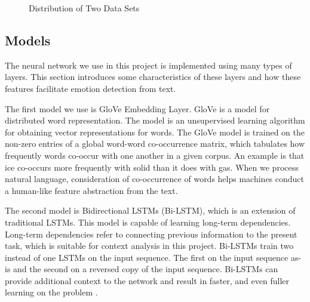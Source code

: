 \documentclass[11pt,a4paper,man,floatsintext]{apa6}
\begin{document}
\begin{figure}[H]
\hfill
{}
\hfill
{}
\hfill
\caption{Distribution of Two Data Sets\label{datadist}}
\end{figure}

\subsection{Models}
The neural network we use in this project is implemented using many types of layers. This section introduces some characteristics of these layers and how these features facilitate emotion detection from text.

The first model we use is GloVe Embedding Layer. GloVe \cite{GloVe} is a model for distributed word representation. The model is an unsupervised learning algorithm for obtaining vector representations for words. The GloVe model is trained on the non-zero entries of a global word-word co-occurrence matrix, which tabulates how frequently words co-occur with one another in a given corpus. An example is that ice co-occurs more frequently with solid than it does with gas. When we process natural language, consideration of co-occurrence of words helps machines conduct a human-like feature abstraction from the text.

The second model is Bidirectional LSTMs (Bi-LSTM), which is an extension of traditional LSTMs. This model is capable of learning long-term dependencies. Long-term dependencies refer to connecting previous information to the present task, which is suitable for context analysis in this project. Bi-LSTMs train two instead of one LSTMs on the input sequence. The first on the input sequence as-is and the second on a reversed copy of the input sequence. Bi-LSTMs can provide additional context to the network and result in faster, and even fuller learning on the problem \cite{bilstm}.
\end{document}
